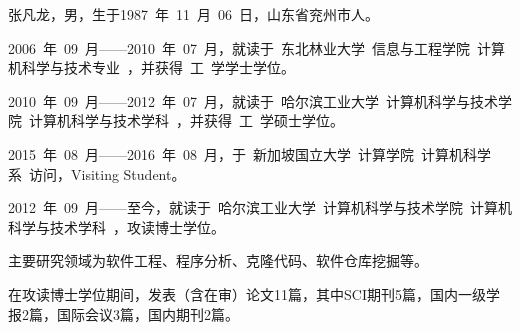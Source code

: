 


张凡龙，男，生于1987~年~11~月~06~日，山东省兖州市人。

2006~年~09~月------2010~年~07~月，就读于~东北林业大学~信息与工程学院~计算机科学与技术专业~，并获得~工~学学士学位。

2010~年~09~月------2012~年~07~月，就读于~哈尔滨工业大学~计算机科学与技术学院~计算机科学与技术学科~，并获得~工~学硕士学位。

2015~年~08~月------2016~年~08~月，于~新加坡国立大学~计算学院~计算机科学系~访问，Visiting Student。

2012~年~09~月------至今，就读于~哈尔滨工业大学~计算机科学与技术学院~计算机科学与技术学科~，攻读博士学位。



主要研究领域为软件工程、程序分析、克隆代码、软件仓库挖掘等。

在攻读博士学位期间，发表（含在审）论文11篇，其中SCI期刊5篇，国内一级学报2篇，国际会议3篇，国内期刊2篇。%

\vspace{3em}\noindent
